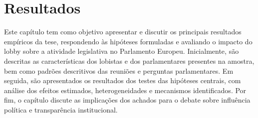 \chapter{Resultados}
\label{chapter:resultados}
Este capítulo tem como objetivo apresentar e discutir os principais resultados empíricos da tese, respondendo às hipóteses formuladas e avaliando o impacto do lobby sobre a atividade legislativa no Parlamento Europeu. Inicialmente, são descritas as características dos lobistas e dos parlamentares presentes na amostra, bem como padrões descritivos das reuniões e perguntas parlamentares. Em seguida, são apresentados os resultados dos testes das hipóteses centrais, com análise dos efeitos estimados, heterogeneidades e mecanismos identificados. Por fim, o capítulo discute as implicações dos achados para o debate sobre influência política e transparência institucional.

% 




